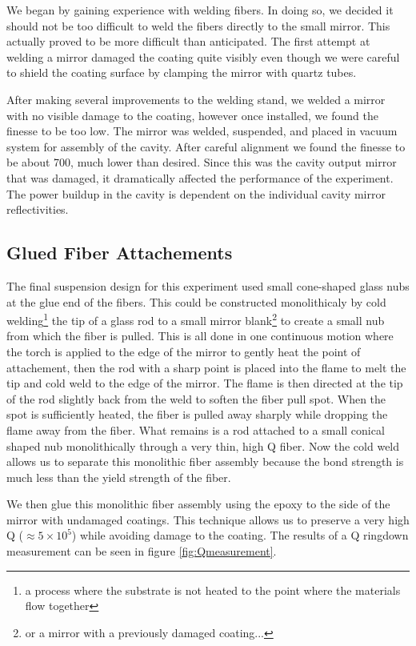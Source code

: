 We began by gaining experience with welding fibers. In doing so, we decided it
should not be too difficult to weld the fibers directly to the small mirror.
This actually proved to be more difficult than anticipated.
The first attempt at welding a mirror damaged the coating quite visibly even
though we were careful to shield the coating surface by clamping the mirror
with quartz tubes.

After making several improvements to the welding stand, we welded a mirror
with no visible damage to the coating, however once installed, we found the
finesse to be too low.
The mirror was welded, suspended, and placed in vacuum system
for assembly of the cavity.
After careful alignment we found the finesse to be about 700, much lower than
desired.
Since this was the cavity output mirror that was damaged, it dramatically
affected the performance of the experiment.
The power buildup in the cavity is dependent on the
individual cavity mirror reflectivities.

\subsection{Glued Fiber Attachements}

The final suspension design for this experiment used small cone-shaped glass
nubs at the glue end of the fibers.
This could be constructed monolithicaly
by cold welding\footnote{a process where the substrate is not heated to the
point where the materials flow together} the tip of a glass rod to a small
mirror blank\footnote{or a mirror with a previously damaged coating...} to
create a small nub from which the fiber is pulled.
This is all done in one
continuous motion where the torch is applied to the edge of the mirror to
gently heat the point of attachement, then the rod with a sharp point is placed
into the flame to melt the tip and cold weld to the edge of the mirror.
The
flame is then directed at the tip of the rod slightly back from the weld to
soften the fiber pull spot.
When the spot is sufficiently heated, the fiber
is pulled away sharply while dropping the flame away from the fiber.
What
remains is a rod attached to a small conical shaped nub monolithically through
a very thin, high Q fiber.
Now the cold weld allows us to separate this
monolithic fiber assembly because the bond strength is much less than the yield
strength of the fiber.

We then glue this monolithic fiber assembly using the epoxy to the side of the
mirror with undamaged coatings.
This technique allows us to preserve a very high Q ($\approx 5\times 10^5$)
while avoiding damage to the coating.
The results of a Q ringdown measurement can be seen in
figure \ref{fig:Qmeasurement}.

